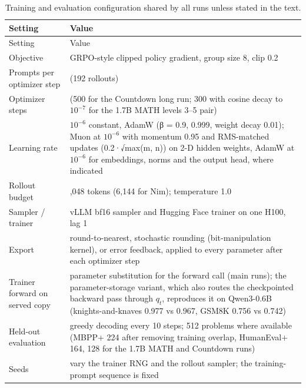 \documentclass[
  10pt,
]{article}
\begin{document}
\begin{longtable}[]{@{}
  >{\raggedright\arraybackslash}p{}
  >{\raggedright\arraybackslash}p{}@{}}
\caption{Training and evaluation configuration shared by all runs unless stated in the
text.}\tabularnewline
\toprule\noalign{}
\begin{minipage}[b]{\linewidth}\raggedright
Setting
\end{minipage} & \begin{minipage}[b]{\linewidth}\raggedright
Value
\end{minipage} \\
\midrule\noalign{}
\endfirsthead
\toprule\noalign{}
\begin{minipage}[b]{\linewidth}\raggedright
Setting
\end{minipage} & \begin{minipage}[b]{\linewidth}\raggedright
Value
\end{minipage} \\
\midrule\noalign{}
\endhead
\bottomrule\noalign{}
\endlastfoot
Objective & GRPO-style clipped policy gradient, group size 8, clip 0.2 \\
Prompts per optimizer step & 24 (192 rollouts) \\
Optimizer steps & 150 (500 for the Countdown long run; 300 with cosine decay to \(10^{-7}\) for the
1.7B MATH levels 3--5 pair) \\
Learning rate & \(10^{-6}\) constant, AdamW (β = 0.9, 0.999, weight decay 0.01); Muon at \(10^{-6}\)
with momentum 0.95 and RMS-matched updates (0.2·√max(m, n)) on 2-D hidden weights, AdamW at
\(10^{-6}\) for embeddings, norms and the output head, where indicated \\
Rollout budget & 2,048 tokens (6,144 for Nim); temperature 1.0 \\
Sampler / trainer & vLLM bf16 sampler and Hugging Face trainer on one H100, lag 1 \\
Export & round-to-nearest, stochastic rounding (bit-manipulation kernel), or error feedback, applied
to every parameter after each optimizer step \\
Trainer forward on served copy & parameter substitution for the forward call (main runs); the
parameter-storage variant, which also routes the checkpointed backward pass through \(q_t\),
reproduces it on Qwen3-0.6B (knights-and-knaves 0.977 vs 0.967, GSM8K 0.756 vs 0.742) \\
Held-out evaluation & greedy decoding every 10 steps; 512 problems where available (MBPP+ 224 after
removing training overlap, HumanEval+ 164, 128 for the 1.7B MATH and Countdown runs) \\
Seeds & vary the trainer RNG and the rollout sampler; the training-prompt sequence is fixed \\
\end{longtable}
\end{document}
